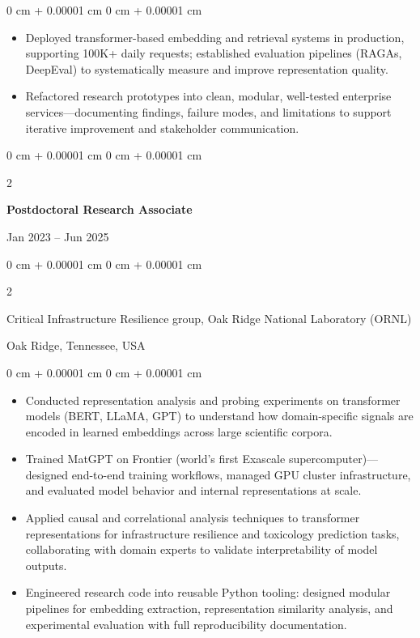 \documentclass[10pt, letterpaper]{article}
\newenvironment{highlights}{
    \begin{itemize}[
        topsep=0.10 cm,
        parsep=0.10 cm,
        partopsep=0pt,
        itemsep=0pt,
        leftmargin=0 cm + 10pt
    ]
}{
    \end{itemize}
} %
\newenvironment{onecolentry}{
    \begin{adjustwidth}{
        0 cm + 0.00001 cm
    }{
        0 cm + 0.00001 cm
    }
}{
    \end{adjustwidth}
} %
\newenvironment{twocolentry}[2][]{
    \onecolentry
    \def\secondColumn{#2}
    \setcolumnwidth{\fill, 4.5 cm}
    \begin{paracol}{2}
}{
    \switchcolumn \raggedleft \secondColumn
    \end{paracol}
    \endonecolentry
} %
\begin{document}
    \begin{onecolentry}
        \begin{highlights}
            \item Deployed transformer-based embedding and retrieval systems in production, supporting 100K+ daily requests; established evaluation pipelines (RAGAs, DeepEval) to systematically measure and improve representation quality.
            \item Refactored research prototypes into clean, modular, well-tested enterprise services—documenting findings, failure modes, and limitations to support iterative improvement and stakeholder communication.
        \end{highlights}
    \end{onecolentry}

\vspace{1mm}
    
    \begin{twocolentry}{Jan 2023 -- Jun 2025}
        \textbf{Postdoctoral Research Associate}
    \end{twocolentry}
    \begin{twocolentry}{Oak Ridge, Tennessee, USA}
        Critical Infrastructure Resilience group, Oak Ridge National Laboratory (ORNL)
    \end{twocolentry}
    \vspace{0.10 cm}
    \begin{onecolentry}
        \begin{highlights}
            \item Conducted representation analysis and probing experiments on transformer models (BERT, LLaMA, GPT) to understand how domain-specific signals are encoded in learned embeddings across large scientific corpora.
            \item Trained MatGPT on Frontier (world’s first Exascale supercomputer)—designed end-to-end training workflows, managed GPU cluster infrastructure, and evaluated model behavior and internal representations at scale.
            \item Applied causal and correlational analysis techniques to transformer representations for infrastructure resilience and toxicology prediction tasks, collaborating with domain experts to validate interpretability of model outputs.
            \item Engineered research code into reusable Python tooling: designed modular pipelines for embedding extraction, representation similarity analysis, and experimental evaluation with full reproducibility documentation.
        \end{highlights}
    \end{onecolentry}
\end{document}
